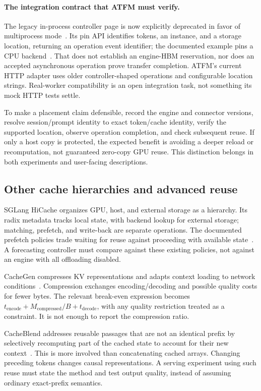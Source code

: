 \paragraph{The integration contract that ATFM must verify.}
The legacy in-process controller page is now explicitly deprecated in favor of
multiprocess mode~\cite{llegacy}. Its pin API identifies tokens, an instance,
and a storage location, returning an operation event identifier; the documented
example pins a CPU backend~\cite{lpin}. That does not establish an engine-HBM
reservation, nor does an accepted asynchronous operation prove transfer
completion. ATFM's current HTTP adapter uses older controller-shaped operations
and configurable location strings. Real-worker compatibility is an open
integration task, not something its mock HTTP tests settle.

To make a placement claim defensible, record the engine and connector versions,
resolve session/prompt identity to exact token/cache identity, verify the
supported location, observe operation completion, and check subsequent reuse.
If only a host copy is protected, the expected benefit is avoiding a deeper
reload or recomputation, not guaranteed zero-copy GPU reuse. This distinction
belongs in both experiments and user-facing descriptions.

\subsection{Other cache hierarchies and advanced reuse}
SGLang HiCache organizes GPU, host, and external storage as a hierarchy. Its
radix metadata tracks local state, with backend lookup for external storage;
matching, prefetch, and write-back are separate operations. The documented
prefetch policies trade waiting for reuse against proceeding with available
state~\cite{hicache}. A forecasting controller must compare against these
existing policies, not against an engine with all offloading disabled.

CacheGen compresses KV representations and adapts context loading to network
conditions~\cite{cachegen}. Compression exchanges encoding/decoding and possible
quality costs for fewer bytes. The relevant break-even expression becomes
$t_{\mathrm{encode}}+M_{\mathrm{compressed}}/B+t_{\mathrm{decode}}$, with any
quality restriction treated as a constraint. It is not enough to report the
compression ratio.

CacheBlend addresses reusable passages that are not an identical prefix by
selectively recomputing part of the cached state to account for their new
context~\cite{cacheblend}. This is more involved than concatenating cached
arrays. Changing preceding tokens changes causal representations. A serving
experiment using such reuse must state the method and test output quality,
instead of assuming ordinary exact-prefix semantics.

